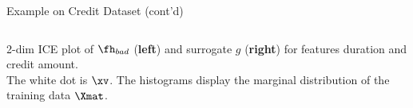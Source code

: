 \documentclass[11pt,compress,t,notes=noshow, aspectratio=169, xcolor=table]{beamer}
\begin{document}
\begin{frame}[c]{Example on Credit Dataset (cont'd)}
\begin{columns}
\begin{column}{0.46\textwidth}
	\end{column}
\end{columns}
\vspace{-0.4cm}
\begin{center}
		{2-dim ICE plot of $\fh_{bad}$ (\textbf{left}) and surrogate $g$ (\textbf{right}) for features duration and credit amount. \\The white dot is $\xv$. The histograms display the marginal distribution of the training data $\Xmat$.}
\end{center}

\end{frame}

%
%
%
\end{document}
